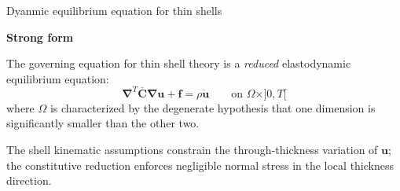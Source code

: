 \documentclass[aspectratio=169]{beamer}
\begin{document}
\begin{frame}{Dyanmic equilibrium equation for thin shells}
  \begin{tcolorbox}[colback=darkred!10,colframe=darkred!40!black]
    \textbf{Strong form}\vspace{0.2cm}

    The governing equation for thin shell theory is a \emph{reduced} elastodynamic equilibrium equation: $$\boldsymbol\nabla^T \overline{\mathbf C}\boldsymbol\nabla \mathbf u+\mathbf f=\rho\mathbf{\ddot{u}}\qquad \text{on }\Omega\times]0,T[$$
    where $\Omega$ is characterized by the degenerate hypothesis that one dimension is significantly smaller than the other two.
  \end{tcolorbox}
  \vspace{0.3cm}
  \footnotesize
  The shell kinematic assumptions constrain the through-thickness variation of $\mathbf u$; the constitutive reduction enforces negligible normal stress in the local thickness direction.
\end{frame}
\end{document}
